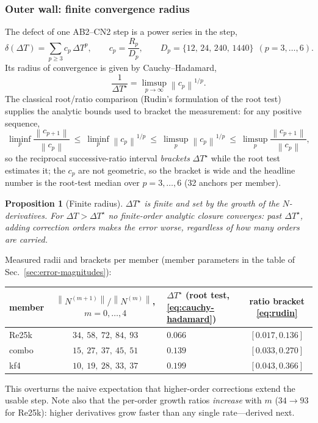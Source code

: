 \documentclass[11pt]{article}
\theoremstyle{plain}
\newtheorem{proposition}{Proposition}
\theoremstyle{definition}
\newcommand{\DT}{\Delta T}
\newcommand{\DTs}{\Delta T^{\star}}
\newcommand{\norm}[1]{\left\lVert #1 \right\rVert}
\begin{document}
\subsubsection{Outer wall: finite convergence radius}
The defect of one AB2--CN2 step is a power series in the step,
\begin{equation}
\delta(\DT)=\sum_{p\ge3}c_p\,\DT^p,\qquad
c_p=\frac{R_p}{D_p},\qquad D_p=\{12,\,24,\,240,\,1440\}\ \ (p=3,\dots,6).
\label{eq:defect-series}
\end{equation}
Its radius of convergence is given by Cauchy--Hadamard,
\begin{equation}
\frac1{\DTs}=\limsup_{p\to\infty}\norm{c_p}^{1/p}.
\label{eq:cauchy-hadamard}
\end{equation}
The classical root/ratio comparison (Rudin's formulation of the root test)
supplies the analytic bounds used to bracket the measurement: for any
positive sequence,
\begin{equation}
\liminf_{p}\frac{\norm{c_{p+1}}}{\norm{c_p}}
\ \le\ \liminf_p\norm{c_p}^{1/p}
\ \le\ \limsup_p\norm{c_p}^{1/p}
\ \le\ \limsup_{p}\frac{\norm{c_{p+1}}}{\norm{c_p}},
\label{eq:rudin}
\end{equation}
so the reciprocal successive-ratio interval \emph{brackets} $\DTs$ while the
root test estimates it; the $c_p$ are not geometric, so the bracket is wide
and the headline number is the root-test median over $p=3,\dots,6$ (32
anchors per member).

\begin{proposition}[Finite radius]
\label{prop:radius}
$\DTs$ is finite and set by the growth of the $N$-derivatives. For
$\DT>\DTs$ no finite-order analytic closure converges: past $\DTs$, adding
correction orders makes the error \emph{worse}, regardless of how many orders
are carried.
\end{proposition}

\noindent Measured radii and brackets per member (member parameters in the
table of Sec.~\ref{sec:error-magnitudes}):
\begin{center}\small
\begin{tabular}{lclc}
\toprule
member &
$\norm{N^{(m+1)}}/\norm{N^{(m)}}$, $m=0,\dots,4$ &
$\DTs$ (root test, \eqref{eq:cauchy-hadamard}) & ratio bracket \eqref{eq:rudin}\\
\midrule
Re25k & $34,\ 58,\ 72,\ 84,\ 93$ & $\mathbf{0.066}$ & $[0.017,0.136]$\\
combo & $15,\ 27,\ 37,\ 45,\ 51$ & $\mathbf{0.139}$ & $[0.033,0.270]$\\
kf4   & $10,\ 19,\ 28,\ 33,\ 37$ & $\mathbf{0.199}$ & $[0.043,0.366]$\\
\bottomrule
\end{tabular}
\end{center}
This overturns the naive expectation that higher-order corrections
extend the usable step. Note also that the per-order growth ratios
\emph{increase} with $m$ ($34\to93$ for Re25k): higher derivatives grow faster
than any single rate---derived next.
\end{document}
